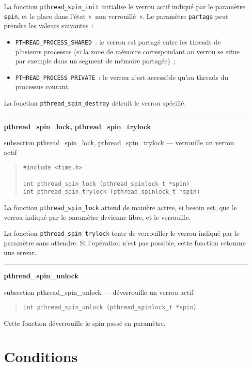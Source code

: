 \documentclass [twoside] {report}
\newcommand {\primitive} [1]
    {
	{\large \bf #1}
	\addcontentsline {toc} {subsection} {#1}
    }
\newcommand {\separation}
    {
	\vspace {7mm}
	\nopagebreak
	\hrule
    }
\begin{document}
La fonction \verb|pthread_spin_init| initialise le verrou actif indiqué
par le paramètre \texttt {spin}, et le place dans l'état «~non
verrouillé~».  Le paramètre \texttt {partage} peut prendre les
valeurs suivantes~:

\begin {itemize}
    \item \verb|PTHREAD_PROCESS_SHARED|~: le verrou
	est partagé entre les threads de plusieurs processus (si la zone
	de mémoire correspondant au verrou se situe par exemple dans un
	segment de mémoire partagée)~;
    \item \verb|PTHREAD_PROCESS_PRIVATE|~: le verrou n'est accessible
	qu'au threads du processus courant.
\end {itemize}

La fonction \verb|pthread_spin_destroy| détruit le verrou spécifié.


\separation
\primitive {pthread\_spin\_lock, pthread\_spin\_trylock} --- verrouille un verrou actif

\begin {quote}
\begin {verbatim}
#include <time.h>

int pthread_spin_lock (pthread_spinlock_t *spin)
int pthread_spin_trylock (pthread_spinlock_t *spin)
\end{verbatim}
\end {quote}

La fonction \verb|pthread_spin_lock| attend de manière active, si
besoin est, que le verrou indiqué par le paramètre devienne libre,
et le verrouille.

La fonction \verb|pthread_spin_trylock| tente de verrouiller le verrou
indiqué par le paramètre sans attendre. Si l'opération n'est pas
possible, cette fonction retourne une erreur.



\separation
\primitive {pthread\_spin\_unlock} --- déverrouille un verrou actif

\begin {quote}
\begin {verbatim}
int pthread_spin_unlock (pthread_spinlock_t *spin)
\end{verbatim}
\end {quote}

Cette fonction déverrouille le spin passé en paramètre.


\section {Conditions}
\end{document}
